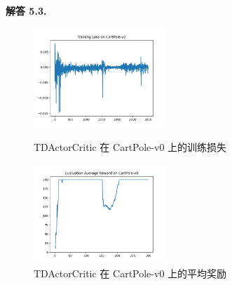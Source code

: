 \documentclass[12pt, a4paper, oneside]{ctexart}
\newenvironment{solution}[1]{\par\noindent\textbf{解答 #1. }\par}{\par}
\begin{document}
\begin{solution}{5.3}
    \begin{figure}[htbp]

        \centering
        \begin{minipage}[t]{0.48\textwidth}
        \centering
        \includegraphics[width=5cm]{../code/policy_gradient/figs/Training Loss on CartPole-v0 with algorithm TDActorCritic .png}
        \caption{TDActorCritic 在 CartPole-v0 上的训练损失}
        \end{minipage}
        \begin{minipage}[t]{0.48\textwidth}
        \centering
        \includegraphics[width=5cm]{../code/policy_gradient/figs/Evaluation Average Reward on CartPole-v0 with algorithm TDActorCritic.png}
        \caption{TDActorCritic 在 CartPole-v0 上的平均奖励}
        \end{minipage}

    \end{figure}

    \begin{figure}[htbp]


\end{figure}
\end{solution}
\end{document}
